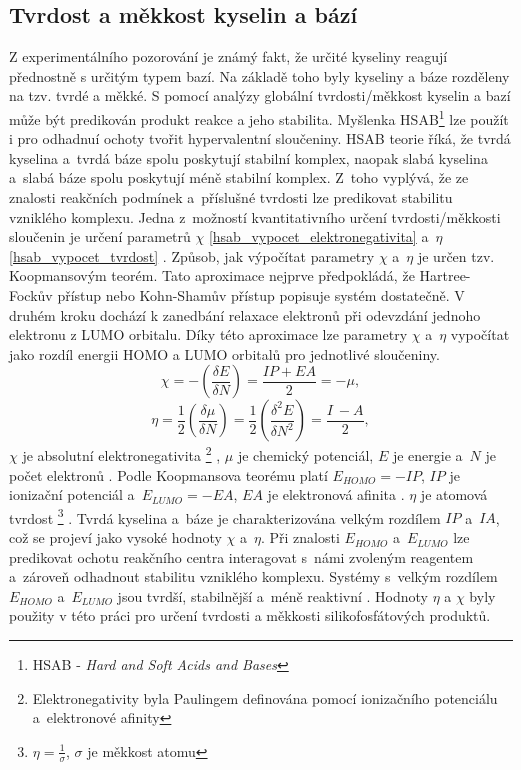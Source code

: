 \documentclass[
  digital, %
  table,   %
  lof,     %
  lot,     %
  oneside,
]{fithesis3}
\begin{document}
\subsection{Tvrdost a měkkost kyselin a bází}
Z experimentálního pozorování je známý fakt, že určité kyseliny reagují přednostně s určitým typem bazí. Na základě toho byly kyseliny a báze rozděleny na tzv. tvrdé a měkké. S pomocí analýzy globální tvrdosti/měkkost kyselin a bazí může být predikován produkt reakce a jeho stabilita. Myšlenka HSAB\footnote{HSAB - \textit{Hard and Soft Acids and Bases}} lze použít i pro odhadnuí ochoty tvořit hypervalentní sloučeniny. HSAB teorie říká, že tvrdá kyselina a~tvrdá báze spolu poskytují stabilní komplex, naopak slabá kyselina a~slabá báze spolu poskytují méně stabilní komplex. Z~toho vyplývá, že ze znalosti reakčních podmínek a~příslušné tvrdosti lze predikovat stabilitu vzniklého komplexu. Jedna z~možností kvantitativního určení tvrdosti/měkkosti sloučenin je určení parametrů $\chi$ \ref{hsab_vypocet_elektronegativita} a~$\eta$ \ref{hsab_vypocet_tvrdost} \cite{hsabclanek}. Způsob, jak výpočítat parametry $\chi$ a~$\eta$ je určen tzv. Koopmansovým teorém. Tato aproximace nejprve předpokládá, že Hartree-Fockův přístup nebo Kohn-Shamův přístup popisuje systém dostatečně. V druhém kroku dochází k zanedbání relaxace elektronů při odevzdání jednoho elektronu z LUMO orbitalu. Díky této aproximace lze parametry $\chi$ a~$\eta$ vypočítat jako rozdíl energii HOMO a LUMO orbitalů pro jednotlivé sloučeniny.
 \begin{equation}
 \chi = - \left( \frac{\delta E}{\delta N} \right) = \frac{IP + EA}{2} = -\mu,
 \label{hsab_vypocet_elektronegativita}
 \end{equation}
 \begin{equation}
 \eta = \frac{1}{2} \left( \frac{\delta \mu}{\delta N} \right) = \frac{1}{2}\left( \frac{\delta^2 E}{\delta N^2} \right) = \frac{I~- A}{2},
 \label{hsab_vypocet_tvrdost}
 \end{equation}
 $\chi$ je absolutní elektronegativita  \footnote{Elektronegativity byla Paulingem definována pomocí ionizačního potenciálu a~elektronové afinity} , $\mu$ je chemický potenciál, $E$ je energie a~$N$ je počet elektronů \cite{hsabwatoc}. Podle Koopmansova teorému platí $E_{HOMO} = - IP$, $IP$ je ionizační potenciál a~$E_{LUMO} = -EA$, $EA$ je elektronová afinita \cite{kratochvilexcerpta}. $\eta$ je atomová tvrdost \footnote{$\eta = \frac{1}{\sigma}$, $\sigma$ je měkkost atomu} \cite{pearson1986absolute}. Tvrdá kyselina a~báze je charakterizována velkým rozdílem $IP$ a~$IA$, což se projeví jako vysoké hodnoty $\chi$ a~$\eta$. Při znalosti $E_{HOMO}$ a~$E_{LUMO}$ lze predikovat ochotu reakčního centra interagovat s~námi zvoleným reagentem a~zároveň odhadnout stabilitu vzniklého komplexu. Systémy s~velkým rozdílem $E_{HOMO}$ a~$E_{LUMO}$ jsou tvrdší, stabilnější a~méně reaktivní \cite{hsabwatoc}. Hodnoty $\eta$ a $\chi$ byly použity v této práci pro určení tvrdosti a měkkosti silikofosfátových produktů.\\
\end{document}
